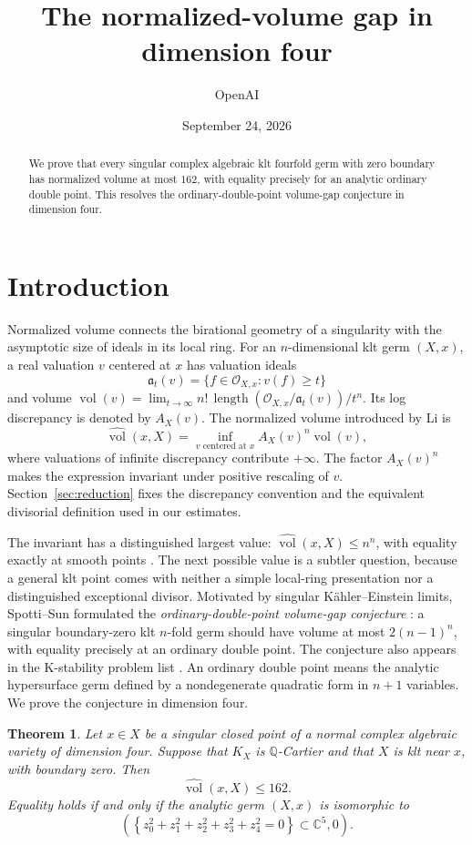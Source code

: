 \documentclass[11pt]{article}
\title{The normalized-volume gap in dimension four}
\author{OpenAI}
\date{September 24, 2026}
\newtheorem{theorem}{Theorem}[section]
\theoremstyle{definition}
\theoremstyle{remark}
\numberwithin{equation}{section}
\newcommand{\C}{\mathbb C}
\newcommand{\Q}{\mathbb Q}
\newcommand{\nvol}{\widehat{\operatorname{vol}}}
\newcommand{\vol}{\operatorname{vol}}
\newcommand{\length}{\operatorname{length}}
\newcommand{\cO}{\mathcal O}
\begin{document}
\maketitle
\begin{abstract}
We prove that every singular complex algebraic klt fourfold germ with zero boundary has normalized volume at most \(162\), with equality precisely for an analytic ordinary double point. This resolves the ordinary-double-point volume-gap conjecture in dimension four.
\end{abstract}

\section{Introduction}\label{sec:intro}

Normalized volume connects the birational geometry of a singularity with the asymptotic size of ideals in its local ring. For an \(n\)-dimensional klt germ \((X,x)\), a real valuation \(v\) centered at \(x\) has valuation ideals
\[
\mathfrak a_t(v)=\{f\in\cO_{X,x}:v(f)\ge t\}
\]
and volume \(\vol(v)=\lim_{t\to\infty}n!\,\length(\cO_{X,x}/\mathfrak a_t(v))/t^n\). Its log discrepancy is denoted by \(A_X(v)\). The normalized volume introduced by Li \cite{Li} is
\[
\nvol(x,X)=\inf_{v\text{ centered at }x}A_X(v)^n\vol(v),
\]
where valuations of infinite discrepancy contribute \(+\infty\). The factor \(A_X(v)^n\) makes the expression invariant under positive rescaling of \(v\). Section~\ref{sec:reduction} fixes the discrepancy convention and the equivalent divisorial definition used in our estimates.

The invariant has a distinguished largest value: \(\nvol(x,X)\le n^n\), with equality exactly at smooth points \cite[Theorem~1.6]{LiuXu}. The next possible value is a subtler question, because a general klt point comes with neither a simple local-ring presentation nor a distinguished exceptional divisor. Motivated by singular K\"ahler--Einstein limits, Spotti--Sun formulated the \emph{ordinary-double-point volume-gap conjecture} \cite[Conjecture~5.5]{SpottiSun}: a singular boundary-zero klt \(n\)-fold germ should have volume at most \(2(n-1)^n\), with equality precisely at an ordinary double point. The conjecture also appears in the K-stability problem list \cite[Section~3.2, Problem~33]{XZproblems}. An ordinary double point means the analytic hypersurface germ defined by a nondegenerate quadratic form in \(n+1\) variables. We prove the conjecture in dimension four.

\begin{theorem}\label{thm:main}
Let \(x\in X\) be a singular closed point of a normal complex algebraic variety of dimension four. Suppose that \(K_X\) is \(\Q\)-Cartier and that \(X\) is klt near \(x\), with boundary zero. Then
\[
\nvol(x,X)\le 162.
\]
Equality holds if and only if the analytic germ \((X,x)\) is isomorphic to
\[
\left(\left\{z_0^2+z_1^2+z_2^2+z_3^2+z_4^2=0\right\}\subset\C^5,0\right).
\]
\end{theorem}
\end{document}
